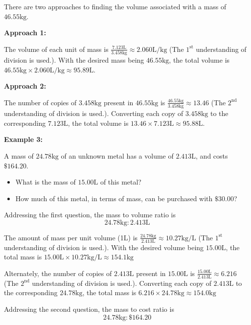 \documentclass{article}
\begin{document}
There are two approaches to finding the volume associated with a mass of \(46.55\text{kg}\). 

\textbf{Approach 1:}

The volume of each unit of mass is \(\frac{7.123\text{L}}{3.458\text{kg}} \approx 2.060\text{L/kg}\) (The \(1^\text{st}\) understanding of division is used.). With the desired mass being \(46.55\text{kg}\), the total volume is \(46.55\text{kg} \times 2.060\text{L/kg} \approx 95.89\text{L}\).

\textbf{Approach 2:}

The number of copies of \(3.458\text{kg}\) present in \(46.55\text{kg}\) is \(\frac{46.55\text{kg}}{3.458\text{kg}} \approx 13.46\) (The \(2^\text{nd}\) understanding of division is used.). Converting each copy of \(3.458\text{kg}\) to the corresponding \(7.123\text{L}\), the total volume is \(13.46 \times 7.123\text{L} \approx 95.88\text{L}\).

\vspace{5mm}

\textbf{Example 3:}

A mass of \(24.78\text{kg}\) of an unknown metal has a volume of \(2.413\text{L}\), and costs \(\$164.20\). 
\begin{itemize}
\item What is the mass of \(15.00\text{L}\) of this metal? 
\item How much of this metal, in terms of mass, can be purchased with \(\$30.00\)? 
\end{itemize}

Addressing the first question, the mass to volume ratio is 
\[24.78\text{kg} : 2.413\text{L}\]

The amount of mass per unit volume (1L) is \(\frac{24.78\text{kg}}{2.413\text{L}} \approx 10.27\text{kg/L}\) (The \(1^\text{st}\) understanding of division is used.). With the desired volume being \(15.00\text{L}\), the total mass is \(15.00\text{L} \times 10.27\text{kg/L} \approx 154.1\text{kg}\)

Alternately, the number of copies of \(2.413\text{L}\) present in \(15.00\text{L}\) is \(\frac{15.00\text{L}}{2.413\text{L}} \approx 6.216\) (The \(2^\text{nd}\) understanding of division is used.). Converting each copy of \(2.413\text{L}\) to the corresponding \(24.78\text{kg}\), the total mass is \(6.216 \times 24.78\text{kg} \approx 154.0\text{kg}\)

Addressing the second question, the mass to cost ratio is
\[24.78\text{kg} : \$164.20\]
\end{document}
